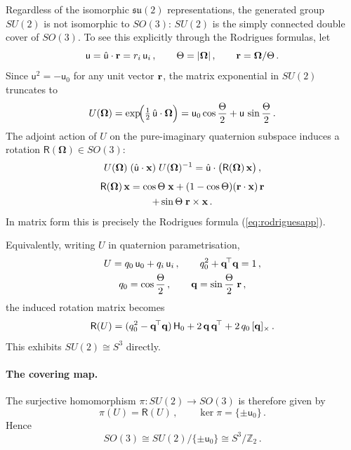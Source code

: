 \documentclass[journal]{IEEEtran}
\newcommand{\bfOmega}{\boldsymbol{\Omega}}
\newcommand{\beq}{\begin{equation}}
\newcommand{\eeq}{\end{equation}}
\begin{document}
Regardless of the isomorphic $\mathfrak{su}(2)$ representations, the generated group
$SU(2)$ is not isomorphic to $SO(3)$: $SU(2)$ is the simply connected double cover
of $SO(3)$. To see this explicitly through the Rodrigues formulas, let
\beq
   \mathsf{u} = \hat{\mathsf{u}}\cdot{\bf r} = r_i\,\mathsf{u}_i\,,\qquad
   \Theta = |\bfOmega|\,,\qquad
   {\bf r} = \bfOmega/\Theta\,.
\eeq
Since $\mathsf{u}^2 = -\mathsf{u}_0$ for any unit vector ${\bf r}$, the matrix exponential
in $SU(2)$ truncates to
\beq
   U(\bfOmega) = \exp\!\Bigl(\tfrac{1}{2}\,\hat{\mathsf{u}}\cdot\bfOmega\Bigr)
   = \mathsf{u}_0\cos\frac{\Theta}{2}
     + \mathsf{u}\,\sin\frac{\Theta}{2}\,. \label{eq:rodrigues-su2}
\eeq
The adjoint action of $U$ on the pure-imaginary quaternion subspace induces
a rotation $\mathsf{R}(\bfOmega)\in SO(3)$:
\beq
   U(\bfOmega)\;(\hat{\mathsf{u}}\cdot{\bf x})\;U(\bfOmega)^{-1}
   = \hat{\mathsf{u}}\cdot\bigl(\mathsf{R}(\bfOmega)\,{\bf x}\bigr)\,,
\eeq
\begin{multline}
   \mathsf{R}(\bfOmega)\,{\bf x}
   = \cos\Theta\;{\bf x}
       + (1-\cos\Theta)({\bf r}\cdot{\bf x})\,{\bf r} \\
       + \sin\Theta\; {\bf r}\times{\bf x}\,. \label{eq:rodrigues-vector}
\end{multline}
In matrix form this is precisely the Rodrigues formula (\ref{eq:rodriguesapp}).

Equivalently, writing $U$ in quaternion parametrisation,
\begin{gather}
   U = q_0\,\mathsf{u}_0 + q_i\,\mathsf{u}_i\,,\qquad
   q_0^2 + {\bf q}^{\!\top}{\bf q} = 1\,, \nonumber\\
   q_0 = \cos\frac{\Theta}{2}\,,\qquad
   {\bf q} = \sin\frac{\Theta}{2}\;{\bf r}\,,
\end{gather}
the induced rotation matrix becomes
\beq
   \mathsf{R}(U) = (q_0^2 - {\bf q}^{\!\top}{\bf q})\,\mathsf{H}_0
          + 2\,{\bf q}\,{\bf q}^{\!\top}
          + 2\,q_0\,[{\bf q}]_\times\,. \label{eq:quaternion-to-R}
\eeq
This exhibits $SU(2)\cong S^3$ directly.

\paragraph{The covering map.}
The surjective homomorphism $\pi\colon SU(2)\to SO(3)$ is therefore given by
\beq
   \pi(U) = \mathsf{R}(U)\,,\qquad
   \ker\pi = \{\pm \mathsf{u}_0\}\,.
\eeq
Hence
\beq
   SO(3) \cong SU(2)/\{\pm \mathsf{u}_0\} \cong S^3/\mathbb{Z}_2\,.
\eeq
\end{document}
